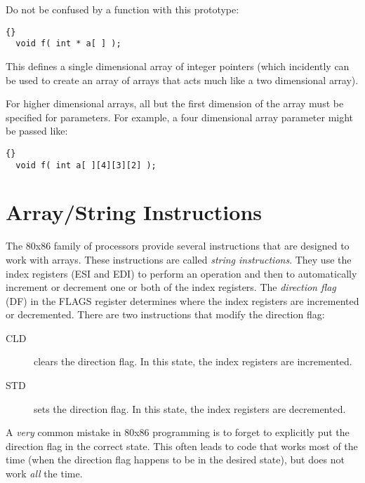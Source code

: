 Do not be confused by a function with this prototype:
\begin{lstlisting}[stepnumber=0]{}
  void f( int * a[ ] );
\end{lstlisting}
This defines a single dimensional array of integer pointers (which incidently
can be used to create an array of arrays that acts much like a two dimensional
array).

For higher dimensional arrays, all but the first dimension of the array must
be specified for parameters. For example, a four dimensional array parameter
might be passed like:
\begin{lstlisting}[stepnumber=0]{}
  void f( int a[ ][4][3][2] );
\end{lstlisting}

\section{Array/String Instructions}

The 80x86 family of processors provide several instructions that are
designed to work with arrays. These instructions are called
\emph{string instructions}. They use the index registers (ESI and EDI)
to perform an operation and then to automatically increment or
decrement one or both of the index registers. The \emph{direction
flag} (DF)  in the FLAGS register determines
where the index registers are incremented or decremented. There are
two instructions that modify the direction flag:
\begin{description}
\item[CLD]  clears the direction flag. In this state, the index registers
           are incremented.
\item[STD]  sets the direction flag. In this state, the index registers are
           decremented.
\end{description}
A \emph{very} common mistake in 80x86 programming is to forget to explicitly
put the direction flag in the correct state. This often leads to code that
works most of the time (when the direction flag happens to be in the desired
state), but does not work \emph{all} the time.

